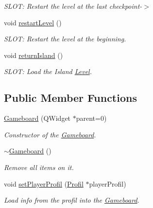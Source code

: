 \begin{DoxyCompactItemize}
\begin{DoxyCompactList}\small\item\em S\+L\+O\+T\+: Restart the level at the last checkpoint-\/$>$ \end{DoxyCompactList}\item 
\hypertarget{class_gameboard_a0d4ac38611d2ed24732823656ba613e0}{}void \hyperlink{class_gameboard_a0d4ac38611d2ed24732823656ba613e0}{restart\+Level} ()\label{class_gameboard_a0d4ac38611d2ed24732823656ba613e0}

\begin{DoxyCompactList}\small\item\em S\+L\+O\+T\+: Restart the level at the beginning. \end{DoxyCompactList}\item 
\hypertarget{class_gameboard_a538d797eadaa51a15c999c14f984f76c}{}void \hyperlink{class_gameboard_a538d797eadaa51a15c999c14f984f76c}{return\+Island} ()\label{class_gameboard_a538d797eadaa51a15c999c14f984f76c}

\begin{DoxyCompactList}\small\item\em S\+L\+O\+T\+: Load the Island \hyperlink{class_level}{Level}. \end{DoxyCompactList}\end{DoxyCompactItemize}
\subsection*{Public Member Functions}
\begin{DoxyCompactItemize}
\item 
\hyperlink{class_gameboard_a82157069ecfab2d2245b7d5df563aaae}{Gameboard} (Q\+Widget $\ast$parent=0)
\begin{DoxyCompactList}\small\item\em Constructor of the \hyperlink{class_gameboard}{Gameboard}. \end{DoxyCompactList}\item 
\hypertarget{class_gameboard_a4387b654115aa01bd309e5e0b6c8724a}{}\hyperlink{class_gameboard_a4387b654115aa01bd309e5e0b6c8724a}{$\sim$\+Gameboard} ()\label{class_gameboard_a4387b654115aa01bd309e5e0b6c8724a}

\begin{DoxyCompactList}\small\item\em Remove all items on it. \end{DoxyCompactList}\item 
void \hyperlink{class_gameboard_a7ac10eb79b85cecff7fdeda1f31e980b}{set\+Player\+Profil} (\hyperlink{class_profil}{Profil} $\ast$player\+Profil)
\begin{DoxyCompactList}\small\item\em Load info from the profil into the \hyperlink{class_gameboard}{Gameboard}. \end{DoxyCompactList}\end{DoxyCompactItemize}
